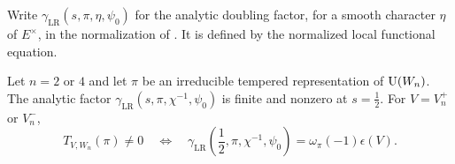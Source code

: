 Write
$\gamma_{\mathrm{LR}}(s,\pi,\eta,\psi_0)$ for the analytic doubling
factor, for a smooth character $\eta$ of $E^\times$, in the normalization
of \cite[\S10.1 and Appendix~A.5]{GanIchinoFormal}. It is defined by the
normalized local functional equation. 
\begin{proposition}\label{ana:criterion}
Let $n=2$ or $4$ and let $\pi$ be an irreducible tempered
representation of $\operatorname{U}(W_n)$. The analytic factor
$\gamma_{\mathrm{LR}}(s,\pi,\chi^{-1},\psi_0)$ is finite and nonzero
at $s=\tfrac12$. For $V=V_n^+$ or $V_n^-$,
\begin{equation}\label{ana:sign}
 T_{V,W_n}(\pi)\ne0
 \quad\Longleftrightarrow\quad
 \gamma_{\mathrm{LR}}\left(\frac12,\pi,\chi^{-1},\psi_0\right)
       =\omega_\pi(-1)\epsilon(V).
\end{equation}
\end{proposition}

